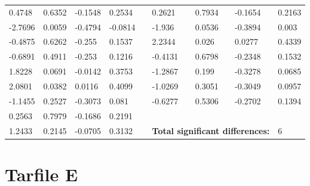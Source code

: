 \begin{table}[h!]
\begin{tabular}{lllllllll}
0.4748 & 0.6352 & -0.1548 & 0.2534 &  & 0.2621 & 0.7934 & -0.1654 & 0.2163 \\
-2.7696 & 0.0059 & -0.4794 & -0.0814 &  & -1.936 & 0.0536 & -0.3894 & 0.003 \\
-0.4875 & 0.6262 & -0.255 & 0.1537 &  & 2.2344 & 0.026 & 0.0277 & 0.4339 \\
-0.6891 & 0.4911 & -0.253 & 0.1216 &  & -0.4131 & 0.6798 & -0.2348 & 0.1532 \\
1.8228 & 0.0691 & -0.0142 & 0.3753 &  & -1.2867 & 0.199 & -0.3278 & 0.0685 \\
2.0801 & 0.0382 & 0.0116 & 0.4099 &  & -1.0269 & 0.3051 & -0.3049 & 0.0957 \\
-1.1455 & 0.2527 & -0.3073 & 0.081 &  & -0.6277 & 0.5306 & -0.2702 & 0.1394 \\ \cline{6-9} 
0.2563 & 0.7979 & -0.1686 & 0.2191 &  &  &  &  &  \\
1.2433 & 0.2145 & -0.0705 & 0.3132 &  & \multicolumn{3}{l}{\textbf{Total significant differences:}} & 6
\end{tabular}
\end{table}


\chapter{Tarfile E}


